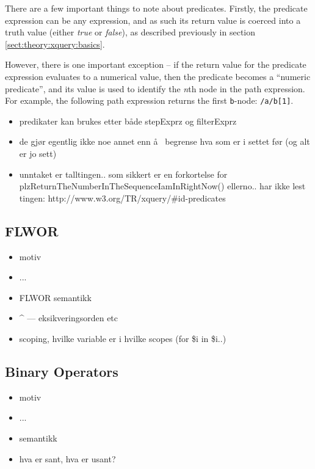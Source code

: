 There are a few important things to note about predicates. Firstly, the
predicate expression can be any expression, and as such its return value is
coerced into a truth value (either \textit{true} or \textit{false}), as
described previously in section \ref{sect:theory:xquery:basics}.

However, there is one important exception -- if the return value for the
predicate expression evaluates to a numerical value, then the predicate
becomes a ``numeric predicate'', and its value is used to identify the
\textit{n}th node in the path expression. For example, the following path
expression returns the first \verb!b!-node: \verb!/a/b[1]!.

\begin{itemize}
  \item predikater kan brukes etter b\aa de stepExprz og filterExprz
  \item de gj\o r egentlig ikke noe annet enn \aa~ begrense hva som er i settet
  f\o r (og alt er jo sett)
  \item unntaket er talltingen.. som sikkert er en forkortelse for
  plzReturnTheNumberInTheSequenceIamInRightNow() ellerno.. har ikke lest
  tingen: http://www.w3.org/TR/xquery/\#id-predicates
\end{itemize}

\subsection{FLWOR}
\label{sect:theory:flwor}

\begin{itemize}
\item motiv
\item ...
\item FLWOR semantikk
\item \^{} --- eksikveringsorden etc
\item scoping, hvilke variable er i hvilke scopes (for \$i in \$i..)
\end{itemize}

\subsection{Binary Operators}

\begin{itemize}
\item motiv
\item ...
\item semantikk
\item hva er sant, hva er usant?
\end{itemize}

